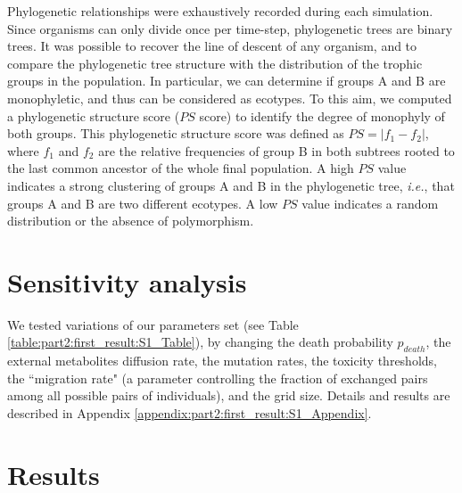 Phylogenetic relationships were exhaustively recorded during each simulation.
Since organisms can only divide once per time-step, phylogenetic trees are binary trees.
It was possible to recover the line of descent of any organism, and to compare the phylogenetic tree structure with the distribution of the trophic groups in the population. In particular, we can determine if groups A and B are monophyletic, and thus can be considered as ecotypes. To this aim, we computed a phylogenetic structure score ($PS$ score) to identify the degree of monophyly of both groups. This phylogenetic structure score was defined as $PS = |f_1 - f_2|$, where $f_1$ and $f_2$ are the relative frequencies of group B in both subtrees rooted to the last common ancestor of the whole final population. A high $PS$ value indicates a strong clustering of groups A and B in the phylogenetic tree, \textit{i.e.}, that groups A and B are two different ecotypes. A low $PS$ value indicates a random distribution or the absence of polymorphism.


\section{Sensitivity analysis}

We tested variations of our parameters set (see Table \ref{table:part2:first_result:S1_Table}), by changing the death probability $p_{death}$, the external metabolites diffusion rate, the mutation rates, the toxicity thresholds, the ``migration rate" (a parameter controlling the fraction of exchanged pairs among all possible pairs of individuals), and the grid size. Details and results are described in Appendix \ref{appendix:part2:first_result:S1_Appendix}.


\section{Results}

